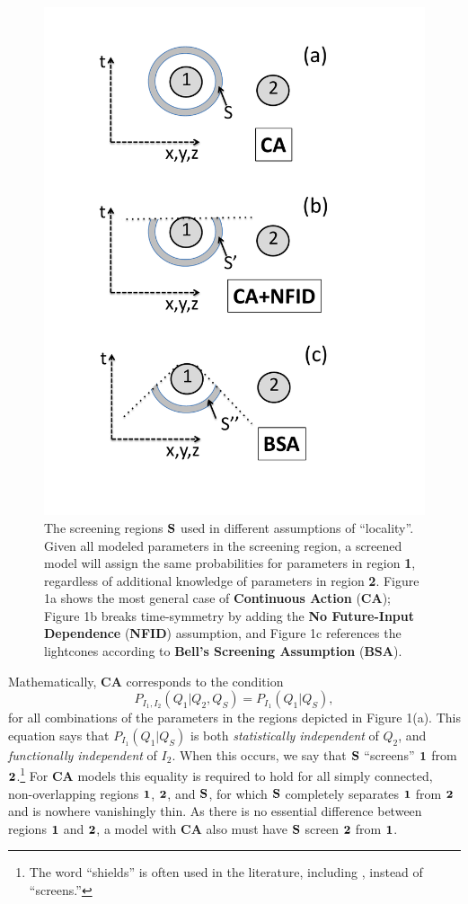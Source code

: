 \documentclass[rmp, aps, preprint, longbibliography]{revtex4-1}
\begin{document}
\begin{figure}[t]%
\centerline{\includegraphics[width=.5\textwidth]{Figure1.pdf}}
\label{Figure:Fig1}
\caption{The screening regions $\bf{S}$ used in different assumptions of ``locality''.  Given all modeled parameters in the screening region, a screened model will assign the same probabilities for parameters in region {\bf 1}, regardless of  additional knowledge of parameters in region {\bf 2}.  Figure 1a shows the most general case of {\bf Continuous Action} ({\bf CA}); Figure 1b breaks time-symmetry by adding the {\bf No Future-Input Dependence} ({\bf NFID}) assumption, and Figure 1c references the lightcones according to {\bf Bell's Screening Assumption} ({\bf BSA}).}
\end{figure}

Mathematically, {\bf CA} corresponds to the condition
\begin{equation}
\label{eq:shield_full}
P_{I_1,I_2}(Q_1|Q_2,Q_S) = P_{I_1}(Q_1|Q_S),
\end{equation}
for all combinations of the parameters in the regions depicted in Figure 1(a).  This equation says that $P_{I_1}(Q_1|Q_S)$ is both {\em statistically independent} of $Q_2$, and {\em functionally independent} of $I_2$.  When this occurs, we say that $\bf{S}$ ``screens'' $\bf{1}$ from $\bf{2}$.\footnote{The word ``shields'' is often used in the literature, including \textcite{bell1990}, instead of ``screens.''}  For {\bf CA} models this equality is required to hold for all simply connected, non-overlapping regions $\bf{1}$, $\bf{2}$, and $\bf{S}$, for which $\bf{S}$ completely separates $\bf{1}$ from $\bf{2}$ and is nowhere vanishingly thin.  As there is no essential difference between regions $\bf{1}$ and $\bf{2}$, a model with {\bf CA} also must have $\bf{S}$ screen $\bf{2}$ from $\bf{1}$.
\end{document}
